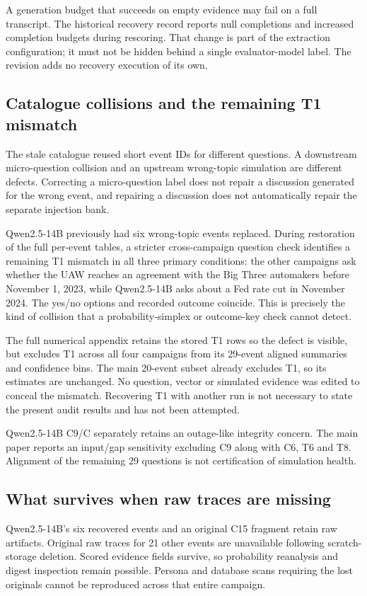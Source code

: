 A generation budget that succeeds on empty evidence may fail on a full transcript. The historical recovery record reports null completions and increased completion budgets during rescoring. That change is part of the extraction configuration; it must not be hidden behind a single evaluator-model label. The revision adds no recovery execution of its own.

\subsection{Catalogue collisions and the remaining T1 mismatch}
\label{sec:fourth_model_status}
The stale catalogue reused short event IDs for different questions. A downstream micro-question collision and an upstream wrong-topic simulation are different defects. Correcting a micro-question label does not repair a discussion generated for the wrong event, and repairing a discussion does not automatically repair the separate injection bank.

Qwen2.5-14B previously had six wrong-topic events replaced. During restoration of the full per-event tables, a stricter cross-campaign question check identifies a remaining T1 mismatch in all three primary conditions: the other campaigns ask whether the UAW reaches an agreement with the Big Three automakers before November 1, 2023, while Qwen2.5-14B asks about a Fed rate cut in November 2024. The yes/no options and recorded outcome coincide. This is precisely the kind of collision that a probability-simplex or outcome-key check cannot detect.

The full numerical appendix retains the stored T1 rows so the defect is visible, but excludes T1 across all four campaigns from its 29-event aligned summaries and confidence bins. The main 20-event subset already excludes T1, so its estimates are unchanged. No question, vector or simulated evidence was edited to conceal the mismatch. Recovering T1 with another run is not necessary to state the present audit results and has not been attempted.

Qwen2.5-14B C9/C separately retains an outage-like integrity concern. The main paper reports an input/gap sensitivity excluding C9 along with C6, T6 and T8. Alignment of the remaining 29 questions is not certification of simulation health.

\subsection{What survives when raw traces are missing}
Qwen2.5-14B's six recovered events and an original C15 fragment retain raw artifacts. Original raw traces for 21 other events are unavailable following scratch-storage deletion. Scored evidence fields survive, so probability reanalysis and digest inspection remain possible. Persona and database scans requiring the lost originals cannot be reproduced across that entire campaign.


